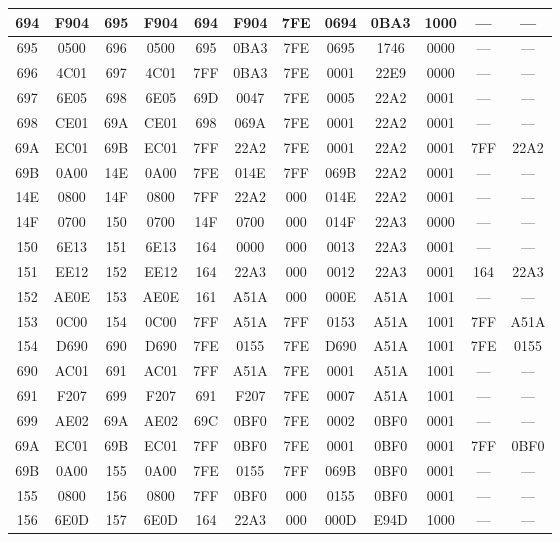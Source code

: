 \begin{center}
\begin{tabular}{|c|c|c|c|c|c|c|c|c|c|c|c|}
\hline
694 & F904 & 695 & F904 & 694 & F904 & 7FE & 0694 & 0BA3 & 1000 & --- & ---\\
\hline
695 & 0500 & 696 & 0500 & 695 & 0BA3 & 7FE & 0695 & 1746 & 0000 & --- & ---\\
\hline
696 & 4C01 & 697 & 4C01 & 7FF & 0BA3 & 7FE & 0001 & 22E9 & 0000 & --- & ---\\
\hline
697 & 6E05 & 698 & 6E05 & 69D & 0047 & 7FE & 0005 & 22A2 & 0001 & --- & ---\\
\hline
698 & CE01 & 69A & CE01 & 698 & 069A & 7FE & 0001 & 22A2 & 0001 & --- & ---\\
\hline
69A & EC01 & 69B & EC01 & 7FF & 22A2 & 7FE & 0001 & 22A2 & 0001 & 7FF & 22A2\\
\hline
69B & 0A00 & 14E & 0A00 & 7FE & 014E & 7FF & 069B & 22A2 & 0001 & --- & ---\\
\hline
14E & 0800 & 14F & 0800 & 7FF & 22A2 & 000 & 014E & 22A2 & 0001 & --- & ---\\
\hline
14F & 0700 & 150 & 0700 & 14F & 0700 & 000 & 014F & 22A3 & 0000 & --- & ---\\
\hline
150 & 6E13 & 151 & 6E13 & 164 & 0000 & 000 & 0013 & 22A3 & 0001 & --- & ---\\
\hline
151 & EE12 & 152 & EE12 & 164 & 22A3 & 000 & 0012 & 22A3 & 0001 & 164 & 22A3\\
\hline
152 & AE0E & 153 & AE0E & 161 & A51A & 000 & 000E & A51A & 1001 & --- & ---\\
\hline
153 & 0C00 & 154 & 0C00 & 7FF & A51A & 7FF & 0153 & A51A & 1001 & 7FF & A51A\\
\hline
154 & D690 & 690 & D690 & 7FE & 0155 & 7FE & D690 & A51A & 1001 & 7FE & 0155\\
\hline
690 & AC01 & 691 & AC01 & 7FF & A51A & 7FE & 0001 & A51A & 1001 & --- & ---\\
\hline
691 & F207 & 699 & F207 & 691 & F207 & 7FE & 0007 & A51A & 1001 & --- & ---\\
\hline
699 & AE02 & 69A & AE02 & 69C & 0BF0 & 7FE & 0002 & 0BF0 & 0001 & --- & ---\\
\hline
69A & EC01 & 69B & EC01 & 7FF & 0BF0 & 7FE & 0001 & 0BF0 & 0001 & 7FF & 0BF0\\
\hline
69B & 0A00 & 155 & 0A00 & 7FE & 0155 & 7FF & 069B & 0BF0 & 0001 & --- & ---\\
\hline
155 & 0800 & 156 & 0800 & 7FF & 0BF0 & 000 & 0155 & 0BF0 & 0001 & --- & ---\\
\hline
156 & 6E0D & 157 & 6E0D & 164 & 22A3 & 000 & 000D & E94D & 1000 & --- & ---\\

\end{tabular}
\end{center}
